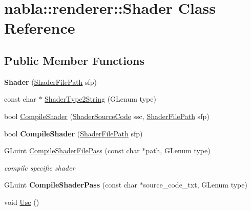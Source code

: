 \hypertarget{classnabla_1_1renderer_1_1_shader}{}\section{nabla\+::renderer\+::Shader Class Reference}
\label{classnabla_1_1renderer_1_1_shader}
\subsection*{Public Member Functions}
\begin{DoxyCompactItemize}
\item 
\mbox{\label{classnabla_1_1renderer_1_1_shader_a1ff66f315ab023743a5a2c30134d9334}} 
{\bfseries Shader} (\mbox{\hyperlink{structnabla_1_1renderer_1_1_shader_file_path}{Shader\+File\+Path}} sfp)
\item 
const char $\ast$ \mbox{\hyperlink{classnabla_1_1renderer_1_1_shader_ae8ea6d1d179f74f30e5298d7d994e462}{Shader\+Type2\+String}} (G\+Lenum type)
\item 
bool \mbox{\hyperlink{classnabla_1_1renderer_1_1_shader_a0a212b60f4c3cfc26940e2de26561fd9}{Compile\+Shader}} (\mbox{\hyperlink{structnabla_1_1renderer_1_1_shader_source_code}{Shader\+Source\+Code}} ssc, \mbox{\hyperlink{structnabla_1_1renderer_1_1_shader_file_path}{Shader\+File\+Path}} sfp)
\item 
\mbox{\label{classnabla_1_1renderer_1_1_shader_a403fc2a84962e1c3dabdef3c2538ba51}} 
bool {\bfseries Compile\+Shader} (\mbox{\hyperlink{structnabla_1_1renderer_1_1_shader_file_path}{Shader\+File\+Path}} sfp)
\item 
G\+Luint \mbox{\hyperlink{classnabla_1_1renderer_1_1_shader_a5d3c867efe766a1c0c38788fe5b42b7c}{Compile\+Shader\+File\+Pass}} (const char $\ast$path, G\+Lenum type)
\begin{DoxyCompactList}\small\item\em compile specific shader \end{DoxyCompactList}\item 
\mbox{\label{classnabla_1_1renderer_1_1_shader_a827e1e1a9b502cc761636a32fe97fb07}} 
G\+Luint {\bfseries Compile\+Shader\+Pass} (const char $\ast$source\+\_\+code\+\_\+txt, G\+Lenum type)
\item 
void \mbox{\hyperlink{classnabla_1_1renderer_1_1_shader_ab48b2ad73cbe3184e339f61e2aebeec9}{Use}} ()

\end{DoxyCompactItemize}
